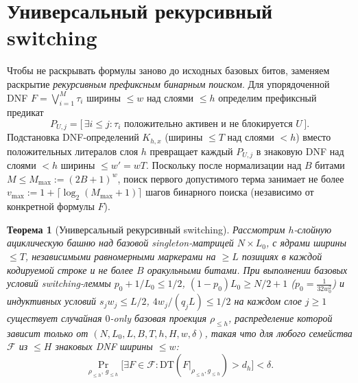 \documentclass[11pt,a4paper]{article}
\newtheorem{theorem}{Теорема}[section]
\theoremstyle{definition}
\theoremstyle{remark}
\newcommand{\DT}{\mathrm{DT}}
\newcommand{\Prb}{\Pr}
\begin{document}
\section{Универсальный рекурсивный switching}

Чтобы не раскрывать формулы заново до исходных базовых битов, заменяем раскрытие \emph{рекурсивным префиксным бинарным поиском}. Для упорядоченной DNF $F = \bigvee_{i=1}^M \tau_i$ ширины $\le w$ над слоями $\le h$ определим префиксный предикат
\[
  P_{U,j} = \bigl[\,\exists i \le j : \tau_i \text{ положительно активен и не блокируется } U\,\bigr].
\]
Подстановка DNF-определений $K_{h,x}$ (ширины $\le T$ над слоями $< h$) вместо положительных литералов слоя $h$ превращает каждый $P_{U,j}$ в знаковую DNF над слоями $< h$ ширины $\le w' = wT$. Поскольку после нормализации над $B$ битами $M \le M_{\max} := (2B+1)^w$, поиск первого допустимого терма занимает не более $v_{\max} := 1 + \lceil \log_2(M_{\max}+1)\rceil$ шагов бинарного поиска (независимо от конкретной формулы $F$).

\begin{theorem}[Универсальный рекурсивный switching]
\label{thm:recursive-switching-ru}
Рассмотрим $h$-слойную ациклическую башню над базовой singleton-матрицей $N \times L_0$, с ядрами ширины $\le T$, независимыми равномерными маркерами на $\ge L$ позициях в каждой кодируемой строке и не более $B$ оракульными битами. При выполнении базовых условий switching-леммы $p_0 + 1/L_0 \le 1/2$, $(1-p_0)L_0 \ge N/2 + 1$ ($p_0 = \frac{1}{32 w_0^2}$) и индуктивных условий $s_j w_j \le L/2$, $4w_j/(q_j L) \le 1/2$ на каждом слое $j \ge 1$ существует случайная $0$-only базовая проекция $\rho_{\le h}$, распределение которой зависит \emph{только} от $(N, L_0, L, B, T, h, H, w, \delta)$, такая что для любого семейства $\mathcal{F}$ из $\le H$ знаковых DNF ширины $\le w$:
\[
  \Prb_{\rho_{\le h},\, g_{\le h}}\bigl[\exists F \in \mathcal{F} : \DT(F|_{\rho_{\le h}, g_{\le h}}) > d_h\bigr] < \delta.
\]
\end{theorem}
\end{document}
